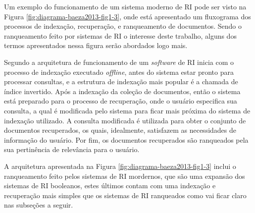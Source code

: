    Um exemplo do funcionamento de um sistema moderno de RI pode ser visto na Figura \ref{fig:diagrama-baeza2013-fig1-3}, onde está apresentado um fluxograma dos processos de indexação, recuperação, e ranqueamento de documentos. 
    Sendo o ranqueamento feito por sistemas de RI o interesse deste trabalho, alguns dos termos apresentados nessa figura serão abordados logo mais.
    
    
    
    Segundo  a arquitetura de funcionamento de um \textit{software} de RI inicia com o processo de indexação executado \textit{offline}, antes do sistema estar pronto para processar consultas, e a estrutura de indexação mais popular é a chamada de índice invertido.
    Após a indexação da coleção de documentos, então o sistema está preparado para o processo de recuperação, onde o usuário especifica sua consulta, a qual é modificada pelo sistema para ficar mais próxima do sistema de indexação utilizado.
    A consulta modificada é utilizada para obter o conjunto de documentos recuperados, os quais, idealmente, satisfazem as necessidades de informação do usuário.
    Por fim, os documentos recuperados são ranqueados pela sua pertinência de relevância para o usuário.
    
    A arquitetura apresentada na Figura \ref{fig:diagrama-baeza2013-fig1-3} inclui o ranqueamento feito pelos sistemas de RI mordernos, que são uma expansão dos sistemas de RI booleanos, estes últimos contam com uma indexação e recuperação mais simples que os sistemas de RI ranqueados como vai ficar claro nas subseções a seguir.

    
    
    

